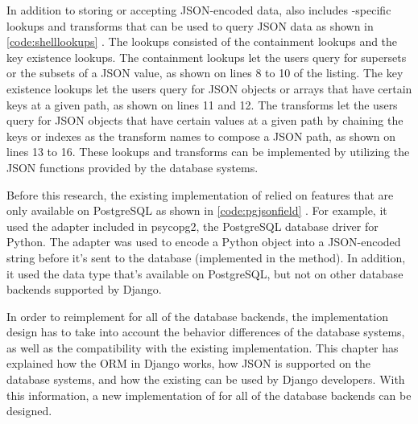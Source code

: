 In addition to storing or accepting JSON-encoded data,  also
includes -specific lookups and transforms that can be used to
query JSON data as shown in \autoref{code:shelllookups}
\cite{django30_modeljsonfield}. The lookups consisted of the containment
lookups and the key existence lookups. The containment lookups let the users
query for supersets or the subsets of a JSON value, as shown on lines 8 to 10
of the listing. The key existence lookups let the users query for JSON objects
or arrays that have certain keys at a given path, as shown on lines 11 and 12.
The transforms let the users query for JSON objects that have certain values at
a given path by chaining the keys or indexes as the transform names to compose
a JSON path, as shown on lines 13 to 16. These lookups and transforms can be
implemented by utilizing the JSON functions provided by the database systems.

\noindent
\begin{minipage}{\linewidth}

\end{minipage}

Before this research, the existing implementation of  relied on
features that are only available on PostgreSQL as shown in
\autoref{code:pgjsonfield} \cite{django:pgjsonfield}. For example, it used the
 adapter included in psycopg2, the PostgreSQL database driver for
Python. The adapter was used to encode a Python object into a JSON-encoded
string before it's sent to the database (implemented in the
 method). In addition, it used the  data
type that's available on PostgreSQL, but not on other database backends
supported by Django.

In order to reimplement  for all of the database backends, the
implementation design has to take into account the behavior differences of the
database systems, as well as the compatibility with the existing
implementation. This chapter has explained how the ORM in Django works, how
JSON is supported on the database systems, and how the existing
 can be used by Django developers. With this information, a new
implementation of  for all of the database backends can be
designed.
